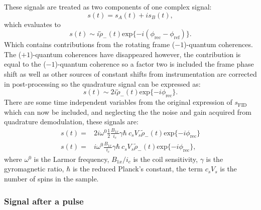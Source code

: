 These signals are treated as two components of one complex signal:
\begin{equation}
  s(t) = s_A(t) + is_B(t),
\end{equation}
which evaluates to
\begin{equation}
  s(t) \sim i\tilde{\rho}_-(t)\text{exp}\{-i(\phi_{\text{rec}} - \phi_{\text{ref}})\}.
\end{equation}
Which contains contributions from the rotating frame ($-1$)-quantum coherences. The ($+1$)-quantum coherences
have disappeared however, the contribution is equal to the ($-1$)-quantum coherence so a factor two is included
the frame phase shift as well as other sources of constant shifts from instrumentation are corrected in post-processing
so the quadrature signal can be expressed as:
\begin{equation}
  s(t) \sim 2i\tilde{\rho}_-(t)\text{exp}\{-i\phi_{\text{rec}}\}.
\end{equation}
There are some time independent variables from the original expression of $s_{\text{FID}}$ which can now be included, and neglecting the
the noise and gain acquired from quadrature demodulation, these signals are:
\begin{align}
  s(t) =& 2i\omega^0\frac{1}{2}\frac{B_{1x}}{i_c}\gamma\hbar~c_sV_s\tilde{\rho}_-(t)\text{exp}\{-i\phi_{\text{rec}}\}\\
  s(t) =& i\omega^0\frac{B_{1x}}{i_c}\gamma\hbar~c_sV_s\tilde{\rho}_-(t)\text{exp}\{-i\phi_{\text{rec}}\},
\end{align}
where $\omega^0$ is the Larmor frequency, $B_{1x}/i_c$ is the coil sensitivity, $\gamma$ is the gyromagnetic ratio,
$\hbar$ is the reduced Planck's constant, the term $c_sV_s$ is the number of spins in the sample.

\subsubsection{Signal after a pulse}


